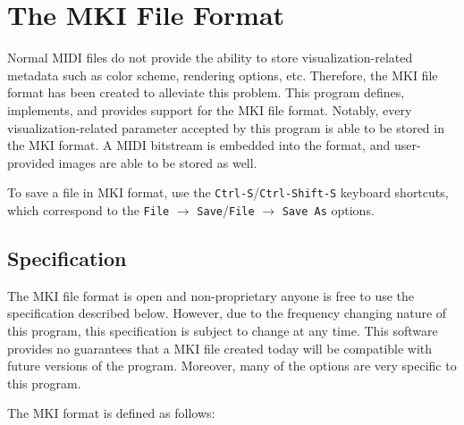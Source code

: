 \documentclass[english]{article}
\providecommand{\mi}[1]{\texttt{#1}}
\begin{document}
\newpage

\section{The MKI File Format}

Normal MIDI files do not provide the ability to store visualization-related metadata such as color scheme,
rendering options, etc. Therefore, the MKI file format has been created to alleviate this problem.
This program defines, implements, and provides support for the MKI file format. Notably, every visualization-related
parameter accepted by this program is able to be stored in the MKI format. A MIDI bitstream is embedded into the format,
and user-provided images are able to be stored as well.

To save a file in MKI format, use the \mi{Ctrl-S}/\mi{Ctrl-Shift-S} keyboard shortcuts, which correspond to the 
\mi{File} $\rightarrow$ \mi{Save}/\mi{File} $\rightarrow$ \mi{Save As}
options.

\subsection{Specification}

The MKI file format is open and non-proprietary \textendash{} anyone is free to use the specification described below. However,
due to the frequency changing nature of this program, this specification is subject to change at any time. This software
provides no guarantees that a MKI file created today will be compatible with future versions of the program. Moreover,
many of the options are very specific to this program.

The MKI format is defined as follows:

\vspace{1em}
\end{document}
